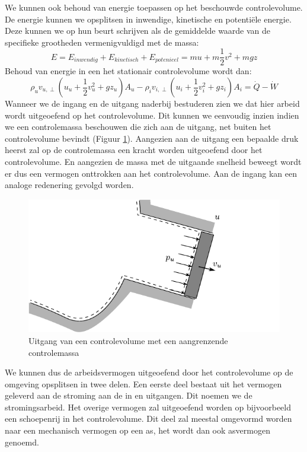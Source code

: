 We kunnen ook behoud van energie toepassen op het beschouwde controlevolume. De energie kunnen we opsplitsen in inwendige, kinetische en potentiële energie. Deze kunnen we op hun beurt schrijven als de gemiddelde waarde van de specifieke grootheden vermenigvuldigd met de massa:
\begin{equation}
	E = E_{inwendig} + E_{kinetisch} + E_{potenieel} = m u + m \frac{1}{2}v^2 + m g z
\end{equation}
Behoud van energie in een het stationair controlevolume wordt dan:
\begin{equation}
	\rho_{u} v_{u,\perp} (u_u + \frac{1}{2}v^2_u + g z_u) A_{u} - \rho_{i} v_{i,\perp} (u_i + \frac{1}{2}v^2_i + g z_i) A_{i} = \dot{Q}-\dot{W}
	\label{eqn:behoud van energie in een controlevolume met een in en uitstroming}
\end{equation}
Wanneer we de ingang en de uitgang naderbij bestuderen zien we dat hier arbeid wordt uitgeoefend op het controlevolume. Dit kunnen we eenvoudig inzien indien we een controlemassa beschouwen die zich aan de uitgang, net buiten het controlevolume bevindt (Figuur \ref{fig:stromingsarbeid}). Aangezien aan de uitgang een bepaalde druk heerst zal op de controlemassa een kracht worden uitgeoefend door het controlevolume. En aangezien de massa met de uitgaande snelheid beweegt wordt er dus een vermogen onttrokken aan het controlevolume. Aan de ingang kan een analoge redenering gevolgd worden.
\begin{figure}[htb]
	\centering
	\includegraphics{fig/controlevolumes/Controlevolume_stromingsarbeid}
	\caption{Uitgang van een controlevolume met een aangrenzende controlemassa}
	\label{fig:stromingsarbeid}
\end{figure}
We kunnen dus de arbeidsvermogen uitgeoefend door het controlevolume op de omgeving opsplitsen in twee delen. Een eerste deel bestaat uit het vermogen geleverd aan de stroming aan de in en uitgangen. Dit noemen we de stromingsarbeid. Het overige vermogen zal uitgeoefend worden op bijvoorbeeld een schoepenrij in het controlevolume. Dit deel zal meestal omgevormd worden naar een mechanisch vermogen op een as, het wordt dan ook asvermogen genoemd.
